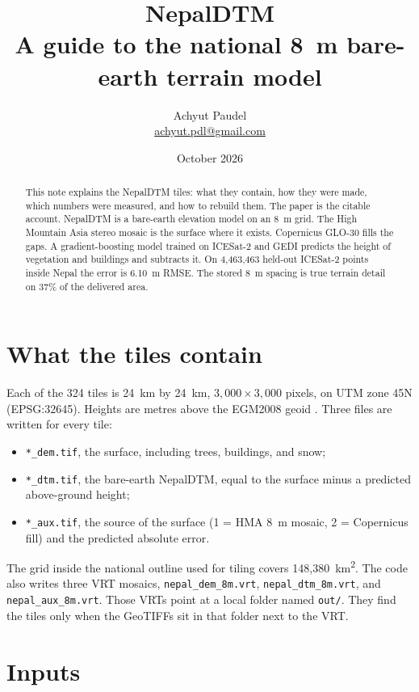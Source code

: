 \documentclass[11pt]{article}
\title{NepalDTM\\[0.3em]
\large A guide to the national 8~m bare-earth terrain model}
\author{Achyut Paudel\\
\small \href{mailto:achyut.pdl@gmail.com}{achyut.pdl@gmail.com}}
\date{October 2026}
\begin{document}
\maketitle

\begin{abstract}
This note explains the NepalDTM tiles: what they contain, how they were made, which numbers were measured, and how to rebuild them.
The paper \citep{paudel2026nepaldtm} is the citable account.
NepalDTM is a bare-earth elevation model on an 8~m grid.
The High Mountain Asia stereo mosaic is the surface where it exists.
Copernicus GLO-30 fills the gaps.
A gradient-boosting model trained on ICESat-2 and GEDI predicts the height of vegetation and buildings and subtracts it.
On 4,463,463 held-out ICESat-2 points inside Nepal the error is 6.10~m RMSE.
The stored 8~m spacing is true terrain detail on 37\% of the delivered area.
\end{abstract}

\section{What the tiles contain}

Each of the 324 tiles is 24~km by 24~km, $3{,}000 \times 3{,}000$ pixels, on UTM zone 45N (EPSG:32645).
Heights are metres above the EGM2008 geoid \citep{pavlis2012egm2008}.
Three files are written for every tile:

\begin{itemize}
  \item \texttt{*\_dem.tif}, the surface, including trees, buildings, and snow;
  \item \texttt{*\_dtm.tif}, the bare-earth NepalDTM, equal to the surface minus a predicted above-ground height;
  \item \texttt{*\_aux.tif}, the source of the surface (1 = HMA 8~m mosaic, 2 = Copernicus fill) and the predicted absolute error.
\end{itemize}

The grid inside the national outline used for tiling covers 148,380~km\textsuperscript{2}.
The code also writes three VRT mosaics, \texttt{nepal\_dem\_8m.vrt}, \texttt{nepal\_dtm\_8m.vrt}, and \texttt{nepal\_aux\_8m.vrt}.
Those VRTs point at a local folder named \texttt{out/}.
They find the tiles only when the GeoTIFFs sit in that folder next to the VRT.

\section{Inputs}
\end{document}
